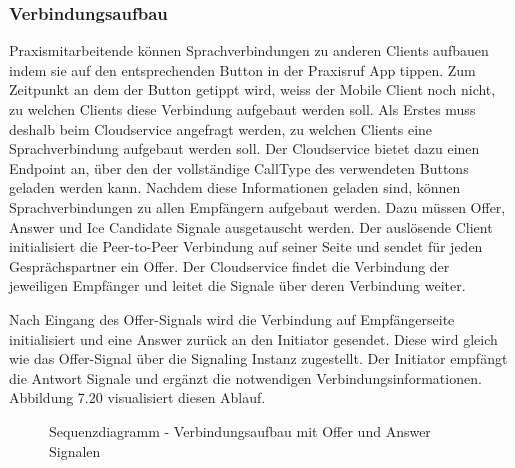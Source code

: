 \clearpage

\subsubsection{Verbindungsaufbau}

Praxismitarbeitende können Sprachverbindungen zu anderen Clients aufbauen indem sie auf den entsprechenden Button in der Praxisruf App tippen.
Zum Zeitpunkt an dem der Button getippt wird, weiss der Mobile Client noch nicht, zu welchen Clients diese Verbindung aufgebaut werden soll.
Als Erstes muss deshalb beim Cloudservice angefragt werden, zu welchen Clients eine Sprachverbindung aufgebaut werden soll.
Der Cloudservice bietet dazu einen Endpoint an, über den der vollständige CallType des verwendeten Buttons geladen werden kann.
Nachdem diese Informationen geladen sind, können Sprachverbindungen zu allen Empfängern aufgebaut werden.
Dazu müssen Offer, Answer und Ice Candidate Signale ausgetauscht werden.
Der auslösende Client initialisiert die Peer-to-Peer Verbindung auf seiner Seite und sendet für jeden Gesprächspartner ein Offer.
Der Cloudservice findet die Verbindung der jeweiligen Empfänger und leitet die Signale über deren Verbindung weiter.

Nach Eingang des Offer-Signals wird die Verbindung auf Empfängerseite initialisiert und eine Answer zurück an den Initiator gesendet.
Diese wird gleich wie das Offer-Signal über die Signaling Instanz zugestellt.
Der Initiator empfängt die Antwort Signale und ergänzt die notwendigen Verbindungsinformationen.
Abbildung 7.20 visualisiert diesen Ablauf.

\begin{figure}[h]
    \centering
    \begin{minipage}[b]{0.9\textwidth}
        \caption{Sequenzdiagramm - Verbindungsaufbau mit Offer und Answer Signalen}
    \end{minipage}
\end{figure}

